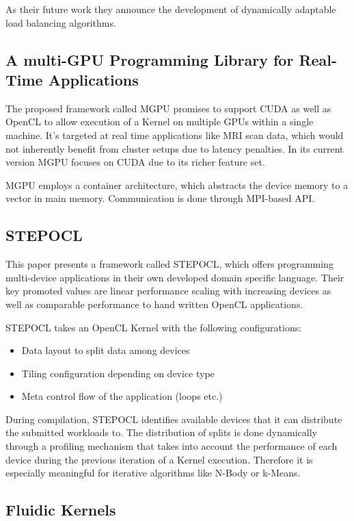 As their future work they announce the development of dynamically adaptable load balancing algorithms.


\subsection{A multi-GPU Programming Library for Real-Time Applications\cite{mgpu}}
The proposed framework called MGPU promises to support CUDA as well as OpenCL to allow execution of a Kernel on multiple GPUs within a single machine. It's targeted at real time applications like MRI scan data, which would not inherently benefit from cluster setups due to latency penalties.  In its current version MGPU focuses on CUDA due to its richer feature set.

MGPU employs a container architecture, which abstracts the device memory to a vector in main memory. Communication is done through MPI-based API.


\subsection{STEPOCL\cite{stepocl}}

This paper presents a framework called STEPOCL, which offers programming multi-device applications in their own developed domain specific language. Their key promoted values are linear performance scaling with increasing devices as well as comparable performance to hand written OpenCL applications.

STEPOCL takes an OpenCL Kernel with the following configurations:
\begin{itemize}
    \item Data layout to split data among devices
    \item Tiling configuration depending on device type
    \item Meta control flow of the application (loops etc.)
\end{itemize}

During compilation, STEPOCL identifies available devices that it can distribute the submitted workloads to. The distribution of splits is done dynamically through a profiling mechanism that takes into account the performance of each device during the previous iteration of a Kernel execution. Therefore it is especially meaningful for iterative algorithms like N-Body or k-Means.

\subsection{Fluidic Kernels\cite{fluidic}}

